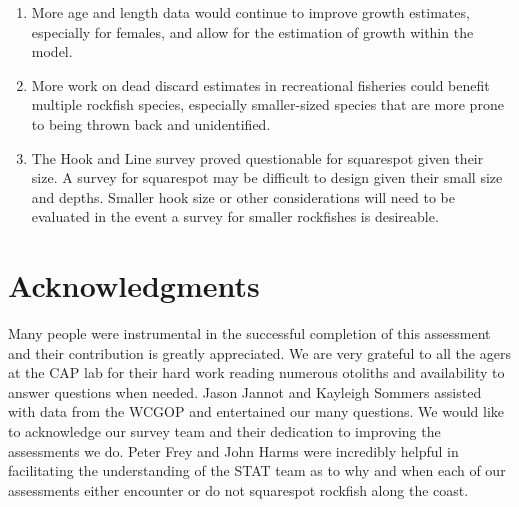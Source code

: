\documentclass[11pt,
  english,
  a4paper,
]{article}
\begin{document}
\begin{enumerate}
\def\labelenumi{\arabic{enumi}.}
\item

  More age and length data would continue to improve growth estimates, especially for females, and allow for the estimation of growth within the model.

  \tagmcend\tagstructend\tagstructend
\item

  More work on dead discard estimates in recreational fisheries could benefit multiple rockfish species, especially smaller-sized species that are more prone to being thrown back and unidentified.

  \tagmcend\tagstructend\tagstructend
\item

  The Hook and Line survey proved questionable for squarespot given their size. A survey for squarespot may be difficult to design given their small size and depths. Smaller hook size or other considerations will need to be evaluated in the event a survey for smaller rockfishes is desireable.

  \tagmcend\tagstructend\tagstructend
\end{enumerate}

\tagstructend


\hypertarget{acknowledgments}{%
\section{Acknowledgments}\label{acknowledgments}}

\leavevmode\tagmcend\tagstructend


Many people were instrumental in the successful completion of this assessment and their contribution is greatly appreciated. We are very grateful to all the agers at the CAP lab for their hard work reading numerous otoliths and availability to answer questions when needed. Jason Jannot and Kayleigh Sommers assisted with data from the WCGOP and entertained our many questions. We would like to acknowledge our survey team and their dedication to improving the assessments we do. Peter Frey and John Harms were incredibly helpful in facilitating the understanding of the STAT team as to why and when each of our assessments either encounter or do not squarespot rockfish along the coast.
\end{document}
